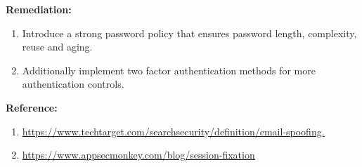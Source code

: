 \documentclass{article}
\begin{document}
\begin{description}[itemsep=2pt, leftmargin=0.2cm]
                            
                    \item \large \textbf{Remediation:}
                            \linespread{1.0}
                            \begin{enumerate}[leftmargin=0.5cm]
                             
                                \item \large  Introduce a strong password policy that ensures password length, complexity, reuse and aging.

                                \item \large Additionally implement two factor authentication methods for more authentication controls.
                            \end{enumerate}

                    \item \large \textbf{Reference:}
                            \linespread{1.0}
                            \begin{enumerate}[leftmargin=0.5cm, ]
                                
                            \item \large \underline{\href{https://www.techtarget.com/searchsecurity/definition/email-spoofing.} {https://www.techtarget.com/searchsecurity/definition/email-spoofing.}}

                            \item \large \underline{\href{https://www.appsecmonkey.com/blog/session-fixation} {https://www.appsecmonkey.com/blog/session-fixation}}
                            \end{enumerate}
                    
                \end{description}

                \newpage
\end{document}

